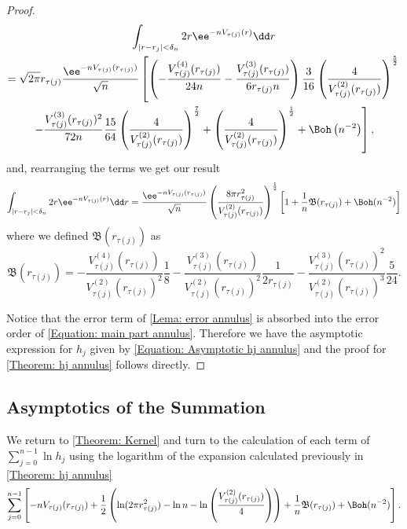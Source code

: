 \begin{proof}
	\begin{multline}
		\int_{|r - r_j| < \delta_n} 2r \ee^{-n V_{\tau(j)}(r)} \dd r\\ 
		 = \sqrt{2\pi} r_{\tau(j)} \frac{\ee^{-n V_{\tau(j)}(r_{\tau(j)})}}{\sqrt{n}} \left[
		\left(- \frac{V^{(4)}_{\tau(j)}(r_{\tau(j)})}{24 n} - \frac{V^{(3)}_{\tau(j)}(r_{\tau(j)})}{6 r_{\tau(j)} n} \right) \frac{3}{16} \left( \frac{4}{V^{(2)}_{\tau(j)}(r_{\tau(j)})} \right)^{\frac{5}{2}} \right. \\
		\left. - \frac{V^{(3)}_{\tau(j)}(r_{\tau(j)})^2}{72 n} \frac{15}{64} \left(\frac{4}{V^{(2)}_{\tau(j)}(r_{\tau(j)})} \right)^{\frac{7}{2}} +
		\left( \frac{4}{V^{(2)}_{\tau(j)}(r_{\tau(j)})} \right)^{\frac{1}{2}} + \Boh\left( n^{-2} \right) \right],
	\end{multline}
	and, rearranging the terms we get our result
	\begin{equation}
		\int_{|r - r_j| < \delta_n} 2r \ee^{-n V_{\tau(j)}(r)} \dd r =  \frac{\ee^{-n V_{\tau(j)}(r_{\tau(j)})}}{\sqrt{n}} \left( \frac{8\pi r_{\tau(j)}^2}{V^{(2)}_{\tau(j)}(r_{\tau(j)})} \right)^{\frac{1}{2}} \left[ 1 + \frac{1}{n} \mathfrak{B}(r_{\tau(j)}) + \Boh(n^{-2}) \right]
		\label{Equation: main part annulus}
	\end{equation}
	where we defined $	\mathfrak{B}(r_{\tau(j)})$ as
	\begin{equation}
		\mathfrak{B}(r_{\tau(j)}) = -\frac{V^{(4)}_{\tau(j)}(r_{\tau(j)})}{V^{(2)}_{\tau(j)}(r_{\tau(j)})^2} \frac{1}{8} - \frac{V^{(3)}_{\tau(j)}(r_{\tau(j)})}{V^{(2)}_{\tau(j)}(r_{\tau(j)})^{2}} \frac{1}{2 r_{\tau(j)}} - \frac{V^{(3)}_{\tau(j)}(r_{\tau(j)})^2}{V^{(2)}_{\tau(j)}(r_{\tau(j)})^{3}} \frac{5}{24}.
	\end{equation}
	
	Notice that the error term of \autoref{Lema: error annulus} is absorbed into the error order of \eqref{Equation: main part annulus}. Therefore we have the asymptotic expression for $h_j$ given by \eqref{Equation: Asymptotic hj annulus} and the proof for \autoref{Theorem: hj annulus} follows directly.
\end{proof}

\subsection{Asymptotics of the Summation}

We return to \autoref{Theorem: Kernel} and turn to the calculation of each term of $	\sum_{j=0}^{n-1} \ln{h_j}$ using the logarithm of the expansion calculated previously in \autoref{Theorem: hj annulus}
\begin{equation}
 \sum_{j=0}^{n-1} \left[-n V_{\tau(j)}(r_{\tau(j)}) + \frac{1}{2} \left(\ln(2\pi r^2_{\tau(j)}) - \ln n - \ln\left(\frac{V^{(2)}_{\tau(j)}(r_{\tau(j)})}{4}\right)  \right) + \frac{1}{n} \mathfrak{B}(r_{\tau(j)}) + \Boh(n^{-2})\right]. 
	\label{Equation: sum log annulus}
\end{equation}

